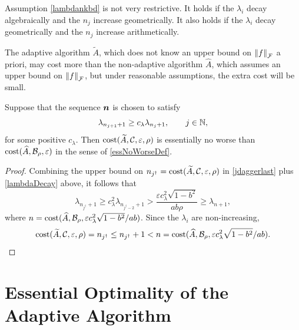 \documentclass[graybox,footinfo]{svmult}
\newcommand{\DHJRnorm}[2][{}]{\ensuremath{\left \lVert #2 \right \rVert}_{#1}}
\begin{document}
Assumption \eqref{lambdankbd} is not very restrictive.  It holds if the $\lambda_i$ decay algebraically and the $n_j$ increase geometrically.  It also holds if the $\lambda_i$ decay geometrically and the $n_j$ increase arithmetically.

The adaptive algorithm $\widetilde{A}$, which does not know an upper bound on $\DHJRnorm[\calF]{f}$ a priori, may cost more than the non-adaptive algorithm $\widehat{A}$, which assumes an upper bound on $\DHJRnorm[\calF]{f}$, but under reasonable assumptions, the extra cost will be small.

\begin{corollary} \label{cor:tAsameCosthA} Suppose that the sequence ${\boldsymbol{n}}$ is chosen to satisfy
\begin{equation} \label{lambdaDecay}
\lambda_{n_{j+1}+1} \ge c_\lambda \lambda_{n_j+1}, \qquad j \in \bbN, 
\end{equation}
for some positive $c_\lambda$.  Then $\textup{cost}(\widetilde{A},{\mathcal{C}}, \varepsilon,\rho)$ is essentially no worse than \linebreak[4]
$\textup{cost}(\widehat{A},{\mathcal{B}}_{\rho},\varepsilon)$ in the sense of \eqref{essNoWorseDef}. 


\end{corollary}

\begin{proof}
Combining the upper bound on $n_{j^\dagger} = \textup{cost}(\widetilde{A},{\mathcal{C}},\varepsilon,\rho)$ in \eqref{jdaggerlast} plus  \eqref{lambdaDecay} above, it follows that
\begin{equation*}
\lambda_{n_{j^\dagger}+1} \ge c_{\lambda}^2 \lambda_{n_{j^\dagger-2}+1} > \frac{\varepsilon c_{\lambda}^2\sqrt{1 - b^2}}{ab \rho} \ge \lambda_{n+1},
\end{equation*}
where $n = \textup{cost}(\widehat{A},{\mathcal{B}}_{\rho},\varepsilon c_{\lambda}^2\sqrt{1 - b^2}/ab)$.
Since the $\lambda_i$ are non-increasing,
\begin{equation*}
\textup{cost}(\widetilde{A},{\mathcal{C}},\varepsilon,\rho) = n_{j^\dagger} \le n_{j^\dagger}+1 < n = \textup{cost}(\widehat{A},{\mathcal{B}}_{\rho},\varepsilon c_{\lambda}^2\sqrt{1 - b^2}/ab).
\end{equation*}
\end{proof}

\section{Essential Optimality of the Adaptive Algorithm} \label{sec:opt}
\end{document}
